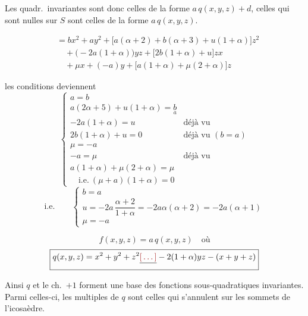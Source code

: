 \documentclass[11pt,a4paper]{article}
\begin{document}
Les  quadr.\ invariantes sont donc celles de la forme $a\,q(x, y, z) + d$, celles qui sont nulles sur $S$ sont celles de la forme $a\,q(x, y, z)$.

\begin{align*}
&= bx^2 + ay^2 + \bigl[a(\alpha + 2) + b(\alpha + 3) + u(1 + \alpha)\bigr]z^2 \\
&\quad + \bigl(-2a(1 + \alpha)\bigr)yz + \bigl[2b(1 + \alpha) + u\bigr]zx \\
&\quad + \mu x + (-a)y + \bigl[a(1 + \alpha) + \mu(2 + \alpha)\bigr]z
\end{align*}

les conditions deviennent
\[ \begin{cases}
a = b \\
a(2\alpha + 5) + u(1 + \alpha) = \underset{a}{b} \\
-2a(1 + \alpha) = u & \text{déjà vu} \\
2b(1 + \alpha) + u = 0 & \text{déjà vu } (b = a) \\
\mu = -a \\
-a = \mu & \text{déjà vu} \\
a(1 + \alpha) + \mu(2 + \alpha) = \mu \\
\quad \text{i.e.}\ (\mu + a)(1 + \alpha) = 0
\end{cases} \]
\[ \text{i.e.} \qquad
\begin{cases}
b = a \\
u = -2a\,\dfrac{\alpha + 2}{1 + \alpha} = -2a\alpha(\alpha + 2) = -2a(\alpha + 1) \\
\mu = -a
\end{cases} \]

\[ f(x, y, z) = a\, q(x, y, z) \quad \text{où} \]
\[ \boxed{q(x, y, z) = x^2 + y^2 + z^2 \struck{\ill{}} - 2(1 + \alpha)yz - (x + y + z)} \]

Ainsi $q$ et le ch.\ $+1$ forment une base des fonctions sous-quadratiques invariantes. Parmi celles-ci, les multiples de $q$ sont celles qui s'annulent sur les sommets de l'icosaèdre.
\end{document}
